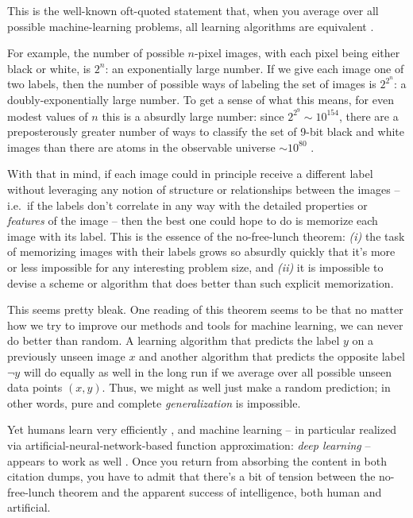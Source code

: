 \documentclass[12pt]{article}
\begin{document}
This is the well-known oft-quoted statement 
that, when you average over all possible machine-learning problems, 
all learning algorithms are equivalent \cite{wolpert1996lack,wolpert1997no}.

For example, the number of possible $n$-pixel images, with each pixel being either black or white, is $2^n$: an exponentially large number. If we give each image one of two labels, then the number of possible ways of labeling the set of images is $2^{2^n}$: a doubly-exponentially large number. To get a sense of what this means, for even modest values of $n$ this is a absurdly large number: since $2^{2^{9}} \sim 10^{154}$, there are a preposterously greater number of ways to classify the set of 9-bit black and white images than there are atoms in the observable universe $\sim 10^{80}$ \cite{eddington2012philosophy}. 

With that in mind, if each image could in principle receive a different label without leveraging any notion of structure or relationships between the images -- i.e.~if the labels don't correlate in any way with the detailed properties or \emph{features} of the image -- then the best one could hope to do is memorize each image with its label. 
This is the essence of the no-free-lunch theorem: \emph{(i)} 
the task of memorizing images with their labels grows so absurdly quickly that it's more or less impossible for any interesting problem size, and \emph{(ii)} it is impossible to devise a scheme or algorithm that does better than such explicit memorization.

  
This seems pretty bleak. One reading of this theorem seems to be that no matter how we try to improve our methods and tools for machine learning, we can never do better than random. A learning algorithm that predicts the label $y$ on a previously unseen image $x$ and another algorithm that predicts the opposite label $\neg y$ will do equally as well in the long run if 
we average over all possible unseen data points $(x,y)$. 
Thus, we might as well just make a random prediction; in other words, pure and complete \emph{generalization} is impossible.



Yet humans learn very efficiently \cite{gopnik1999scientist,griffiths2006optimal,vul2014one}, and machine learning -- in particular realized via  artificial-neural-network-based function approximation: \emph{deep learning} --  appears to work as well \cite{lecun2015deep,ImageNet2012,goodfellow2014generative,mikolov2013efficient,mikolov2013distributed,BERT2018,radford2019language,Brown2020LanguageMA,mnih2015human,silver2016mastering,silver2018general,berner2019dota,starcraft,muzero,alphafold2prelim}. Once you 
return from absorbing the content in both citation dumps, you have to admit that there's a bit of tension between the no-free-lunch theorem and the apparent success of intelligence, both human and artificial.
\end{document}
